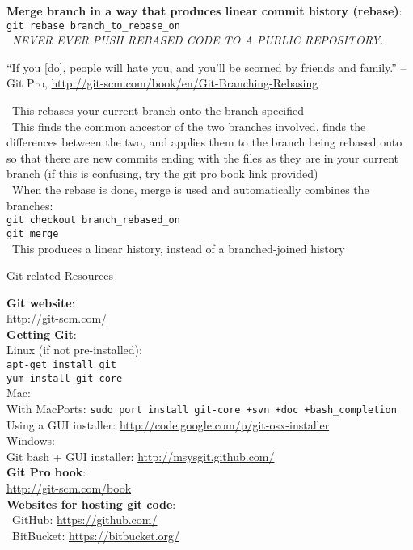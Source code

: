\documentclass[12pt]{article}
\begin{document}
{{\bf Merge branch in a way that produces linear commit history (rebase)}:\\
\texttt{git rebase branch{\_}to{\_}rebase{\_}on}\\
\textbullet\, \emph{NEVER EVER PUSH REBASED CODE TO A PUBLIC REPOSITORY}.
\begin{quoting}[vskip=0pt]
``If you [do], people will hate you, and you’ll be scorned by friends and family.'' --Git Pro, \url{http://git-scm.com/book/en/Git-Branching-Rebasing}
\end{quoting}
\textbullet\, This rebases your current branch onto the branch specified\\
\textbullet\, This finds the common ancestor of the two branches involved, finds the differences between the two, and applies them to the branch being rebased onto so that there are new commits ending with the files as they are in your current branch (if this is confusing, try the git pro book link provided)\\
\textbullet\, When the rebase is done, merge is used and automatically combines the branches:\\
\hspace*{6mm}\texttt{git checkout branch{\_}rebased{\_}on}\\
\hspace*{6mm}\texttt{git merge}\\
\textbullet\, This produces a linear history, instead of a branched-joined history\\
\vspace{5mm}

\begin{center}
{\large Git-related Resources}
\end{center}
{\bf Git website}:\\
\url{http://git-scm.com/}\\

{\bf Getting Git}:\\
Linux (if not pre-installed):\\
\texttt{apt-get install git}\\
\texttt{yum install git-core}\\

Mac:\\
With MacPorts: \texttt{sudo port install git-core +svn +doc +bash{\_}completion}\\
Using a GUI installer: \url{http://code.google.com/p/git-osx-installer}\\

Windows:\\
Git bash + GUI installer: \url{http://msysgit.github.com/}\\

{\bf Git Pro book}:\\
\url{http://git-scm.com/book}\\

{\bf Websites for hosting git code}:\\
\textbullet\, GitHub: \url{https://github.com/}\\
\textbullet\, BitBucket: \url{https://bitbucket.org/}\\
} %
\end{document}
